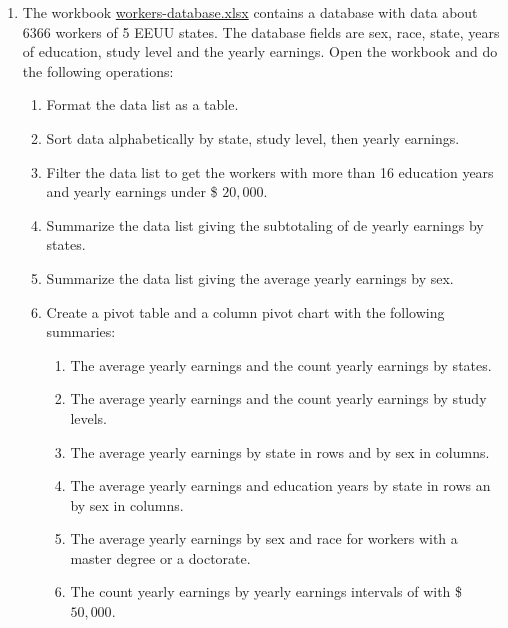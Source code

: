 \begin{enumerate}[leftmargin=*,resume]
\item The workbook
\href{http://aprendeconalf.es/office/excel/exercises/databases/workers-database.xlsx}{\textsf{workers-database.xlsx}}
contains a database with data about 6366 workers of 5 EEUU states.
The database fields are sex, race, state, years of education, study level and the yearly earnings.
Open the workbook and do the following operations:
\begin{enumerate}
\item Format the data list as a table.
\item Sort data alphabetically by state, study level, then yearly earnings.
\item Filter the data list to get the workers with more than 16 education years and yearly earnings under \$ $20,000$.   
\item Summarize the data list giving the subtotaling of de yearly earnings by states. 
\item Summarize the data list giving the average yearly earnings by sex. 
\item Create a pivot table and a column pivot chart with the following summaries: 
\begin{enumerate}
\item The average yearly earnings and the count yearly earnings by states. 
\item The average yearly earnings and the count yearly earnings by study levels.
\item The average yearly earnings by state in rows and by sex in columns.
\item The average yearly earnings and education years by state in rows an by sex in columns.
\item The average yearly earnings by sex and race for workers with a master degree or a doctorate. 
\item The count yearly earnings by yearly earnings intervals of with \$ $50,000$.
\end{enumerate}
\end{enumerate}



\end{enumerate}
